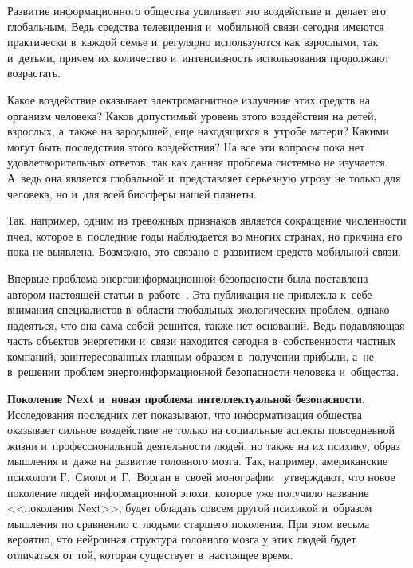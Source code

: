 \begin{multicols}{2}
    Развитие информационного общества усиливает это воздействие 
и~делает его глобальным. Ведь средства телевидения и~мобильной связи 
сегодня имеются практически в~каждой семье и~регулярно используются как 
взрослыми, так и~детьми, причем их количество и~интенсивность 
использования продолжают возрастать. 
    
    Какое воздействие оказывает электромагнитное излучение этих средств 
на организм человека?\linebreak
 Каков допустимый уровень этого воздействия на 
детей, взрослых, а~также на зародышей, еще находящихся в~утробе матери? 
Какими могут быть последствия этого воздействия? На все эти вопросы пока 
нет удовлетворительных ответов, так как данная проблема системно не 
изучается. А~ведь она является глобальной и~представляет серьезную угрозу 
не только для человека, но и~для всей биосферы нашей планеты. 
    
    Так, например, одним из тревожных признаков является сокращение 
численности пчел, которое в~последние годы наблюдается во многих странах, 
но причина его пока не выявлена. Возможно, это связано с~развитием средств 
мобильной связи.
    
    Впервые проблема энергоинформационной без\-опас\-ности была 
поставлена автором настоящей статьи в~работе~\cite{19-kol}. Эта публикация 
не привлекла к~себе внимания специалистов в~области глобальных 
экологических проблем, однако надеяться, что она сама собой решится, 
также нет оснований. Ведь подавляющая часть объектов энергетики и~связи 
находится сегодня в~собственности частных компаний, заинтересованных 
главным образом в~получении прибыли, а~не в~решении проблем 
энергоинформационной безопасности человека и~общества. 
    
    \textbf{Поколение Next и~новая проблема интеллектуальной 
безопасности.} Исследования последних лет показывают, что 
информатизация общества оказывает сильное воздействие не только на 
социальные аспекты повседневной жизни и~профессиональной деятельности 
людей, но также на их психику, образ мышления и~даже на развитие 
головного мозга. Так, например, американские психологи Г.~Смолл 
и~Г.~Ворган в~своей монографии~\cite{6-kol} утверждают, что новое поколение людей 
информационной эпохи, которое уже получило название <<поколения 
Next>>, будет обладать совсем другой психикой и~образом мышления по 
сравнению с~людьми старшего поколения. При этом весьма вероятно, что 
нейронная структура головного мозга у этих людей будет отличаться от той, 
которая существует в~настоящее время.
    

\end{multicols}
